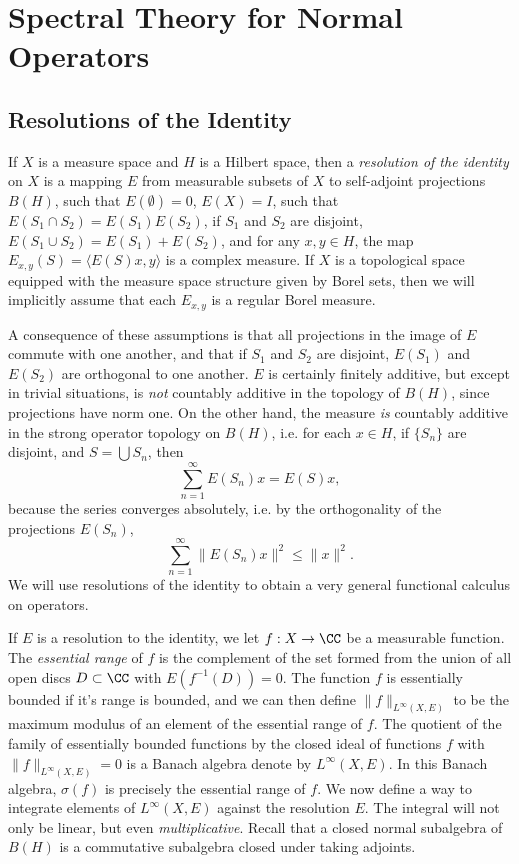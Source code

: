 \chapter{Spectral Theory for Normal Operators}

\section{Resolutions of the Identity}

If $X$ is a measure space and $H$ is a Hilbert space, then a \emph{resolution of the identity} on $X$ is a mapping $E$ from measurable subsets of $X$ to self-adjoint projections $B(H)$, such that $E(\emptyset) = 0$, $E(X) = I$, such that $E(S_1 \cap S_2) = E(S_1) E(S_2)$, if $S_1$ and $S_2$ are disjoint, $E(S_1 \cup S_2) = E(S_1) + E(S_2)$, and for any $x,y \in H$, the map $E_{x,y}(S) = \langle E(S) x, y \rangle$ is a complex measure. If $X$ is a topological space equipped with the measure space structure given by Borel sets, then we will implicitly assume that each $E_{x,y}$ is a regular Borel measure.

A consequence of these assumptions is that all projections in the image of $E$ commute with one another, and that if $S_1$ and $S_2$ are disjoint, $E(S_1)$ and $E(S_2)$ are orthogonal to one another. $E$ is certainly finitely additive, but except in trivial situations, is \emph{not} countably additive in the topology of $B(H)$, since projections have norm one. On the other hand, the measure \emph{is} countably additive in the strong operator topology on $B(H)$, i.e. for each $x \in H$, if $\{ S_n \}$ are disjoint, and $S = \bigcup S_n$, then
%
\[ \sum_{n = 1}^\infty E(S_n) x = E(S) x, \]
%
because the series converges absolutely, i.e. by the orthogonality of the projections $E(S_n)$,
%
\[ \sum_{n = 1}^\infty \| E(S_n) x \|^2 \leq \| x \|^2. \]
%
We will use resolutions of the identity to obtain a very general functional calculus on operators.

If $E$ is a resolution to the identity, we let $f: X \to \CC$ be a measurable function. The \emph{essential range} of $f$ is the complement of the set formed from the union of all open discs $D \subset \CC$ with $E(f^{-1}(D)) = 0$. The function $f$ is essentially bounded if it's range is bounded, and we can then define $\| f \|_{L^\infty(X,E)}$ to be the maximum modulus of an element of the essential range of $f$. The quotient of the family of essentially bounded functions by the closed ideal of functions $f$ with $\| f \|_{L^\infty(X,E)} = 0$ is a Banach algebra denote by $L^\infty(X,E)$. In this Banach algebra, $\sigma(f)$ is precisely the essential range of $f$. We now define a way to integrate elements of $L^\infty(X,E)$ against the resolution $E$. The integral will not only be linear, but even \emph{multiplicative}. Recall that a closed normal subalgebra of $B(H)$ is a commutative subalgebra closed under taking adjoints.

